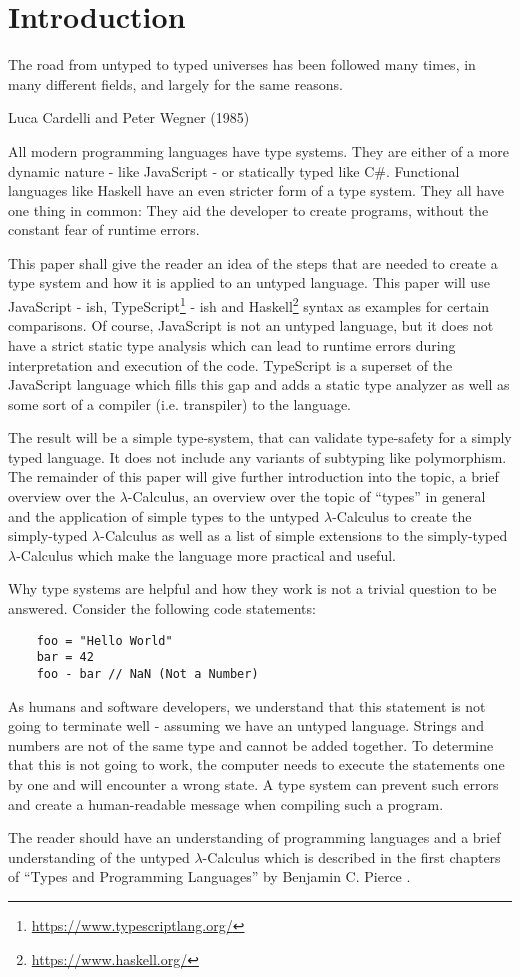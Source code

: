 \section{Introduction}

\epigraph{
    The road from untyped to typed universes has been followed many times,
    in many different fields, and largely for the same reasons.
}
{Luca Cardelli and Peter Wegner (1985)}

All modern programming languages have type systems.
They are either of a more dynamic nature - like JavaScript -
or statically typed like C\#. Functional languages like Haskell have
an even stricter form of a type system. They all have one thing in
common: They aid the developer to create programs, without the
constant fear of runtime errors.

This paper shall give the reader an idea of the steps that
are needed to create a type system and how it is applied to
an untyped language. This paper will use JavaScript - ish,
TypeScript\footnote{\url{https://www.typescriptlang.org/}} - ish
and Haskell\footnote{\url{https://www.haskell.org/}}
syntax as examples for certain comparisons.
Of course, JavaScript is not an untyped language, but
it does not have a strict static type analysis which can lead
to runtime errors during interpretation and execution of the code.
TypeScript is a superset of the JavaScript language which fills this
gap and adds a static type analyzer as well as some sort of a compiler
(i.e. transpiler) to the language.

The result will be a simple type-system, that can validate
type-safety for a simply typed language. It does not include
any variants of subtyping like polymorphism. The remainder
of this paper will give further introduction into the topic,
a brief overview over the $\lambda$-Calculus, an overview
over the topic of ``types'' in general and the application
of simple types to the untyped $\lambda$-Calculus to create the
simply-typed $\lambda$-Calculus as well as a list of simple
extensions to the simply-typed $\lambda$-Calculus which make
the language more practical and useful.

Why type systems are helpful and how they work
is not a trivial question to be answered. Consider
the following code statements:

\begin{verbatim}
    foo = "Hello World"
    bar = 42
    foo - bar // NaN (Not a Number)
\end{verbatim}

As humans and software developers, we understand that this statement
is not going to terminate well - assuming we have an untyped
language. Strings and numbers are not
of the same type and cannot be added together. To determine
that this is not going to work, the computer needs to execute
the statements one by one and will encounter a wrong state.
A type system can prevent such errors and create a
human-readable message when compiling such a program.

The reader should have an understanding of programming
languages and a brief understanding of the untyped
$\lambda$-Calculus which is described in the first
chapters of ``Types and Programming Languages'' by
Benjamin C. Pierce \cite{pierce2002ProgLang}.
